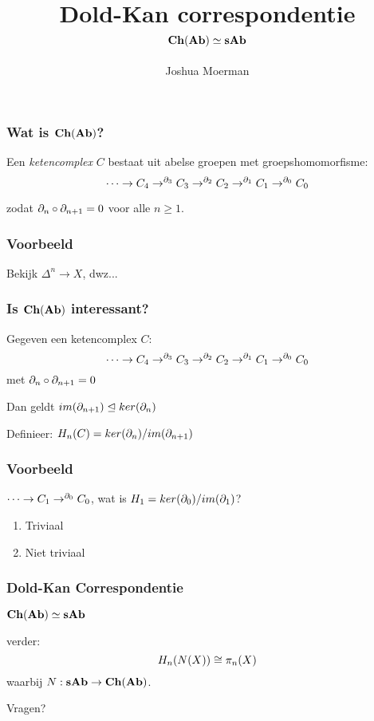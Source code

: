 \documentclass[14pt]{beamer}
\title{Dold-Kan correspondentie
	\huge $$ \mathbf{Ch}(\mathbf{Ab}) \simeq \mathbf{sAb} $$}
\author{Joshua Moerman}
\institute[Radboud Universiteit Nijmegen]{Begeleid door Moritz Groth}
\date{}
\begin{document}
\begin{frame}
	\titlepage
\end{frame}


\begin{frame}
	\frametitle{Wat is $\mathbf{Ch}(\mathbf{Ab})$?}
	\begin{definition}
	Een \emph{ketencomplex} $C$ bestaat uit abelse groepen met groepshomomorfisme:
	$$ \cdots \to C_4 \to^{\partial_3} C_3 \to^{\partial_2} C_2 \to^{\partial_1} C_1 \to^{\partial_0} C_0 $$

	zodat $\partial_n \circ \partial_{n+1} = 0$ voor alle $n \geq 1$.
	\end{definition}
\end{frame}


\begin{frame}
	\frametitle{Voorbeeld}
	Bekijk $\Delta^n \to X$, dwz...
\end{frame}


\begin{frame}
	\frametitle{Is $\mathbf{Ch}(\mathbf{Ab})$ interessant?}
	Gegeven een ketencomplex $C$:
	$$ \cdots \to C_4 \to^{\partial_3} C_3 \to^{\partial_2} C_2 \to^{\partial_1} C_1 \to^{\partial_0} C_0 $$
	met $\partial_n \circ \partial_{n+1} = 0$
	\bigskip
	
	Dan geldt $im(\partial_{n+1}) \trianglelefteq ker(\partial_n)$

	Definieer: $H_n(C) = ker(\partial_n) / im(\partial_{n+1})$
\end{frame}


\begin{frame}
	\frametitle{Voorbeeld}
	$ \cdots \to C_1 \to^{\partial_0} C_0 $, wat is $H_1 = ker(\partial_0) / im(\partial_1)$?

	\begin{enumerate}
		\item Triviaal
		\item Niet triviaal
	\end{enumerate}
\end{frame}


\begin{frame}
	\frametitle{Dold-Kan Correspondentie}
	\begin{center}
	{\Large $ \mathbf{Ch}(\mathbf{Ab}) \simeq \mathbf{sAb} $}

	verder:
	{\Large $$ H_n(N(X)) \cong \pi_n(X) $$}
	waarbij $N : \mathbf{sAb} \to \mathbf{Ch}(\mathbf{Ab})$.
	\end{center}
\end{frame}


\begin{frame}
	\begin{center}
	\Huge Vragen?
	\end{center}
\end{frame}
\end{document}
